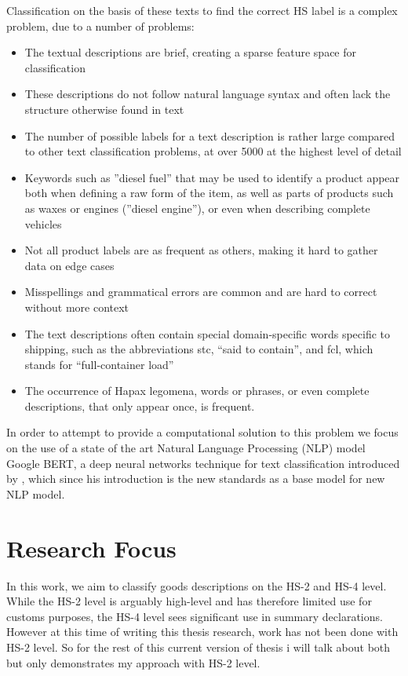 Classification on the basis of these texts to find the correct HS label is a complex problem, due to a number of problems:
\begin{itemize}
\item The textual descriptions are brief, creating a sparse feature space for classification
\item These descriptions do not follow natural language syntax and often lack the structure otherwise found in text
\item The number of possible labels for a text description is rather large compared to other text classification problems, at over 5000 at the highest level of detail
\item Keywords such as ”diesel fuel” that may be used to identify a product appear both when defining a raw form of the item, as well as parts of products such as waxes or engines (”diesel engine”), or even when describing complete vehicles
\item Not all product labels are as frequent as others, making it hard to gather data on edge cases
\item Misspellings and grammatical errors are common \cite{Li2016} and are hard to correct without more context
\item The text descriptions often contain special domain-specific words specific to shipping, such as the abbreviations stc, “said to contain”, and fcl, which stands for “full-container load”
\item The occurrence of Hapax legomena, words or phrases, or even complete descriptions, that only appear once, is frequent.
\end{itemize}

In order to attempt to provide a computational solution to this problem we focus on the use of a state of the art Natural Language Processing (NLP) model Google BERT, a deep neural networks technique for text classification introduced by \cite{Devlin2018}, which since his introduction is the new standards as a base model for new NLP model. \\


\section{Research Focus}
In this work, we aim to classify goods descriptions on the HS-2 and HS-4 level. While the HS-2 level is arguably high-level and has therefore limited use for customs purposes, the HS-4 level sees significant use in summary declarations. However at this time of writing this thesis research, work has not been done with HS-2 level. So for the rest of this current version of thesis i will talk about both but only demonstrates my approach with HS-2 level.

